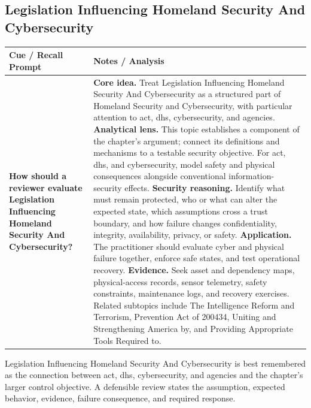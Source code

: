 \documentclass[11pt]{article}
\newcommand{\CornellHeader}{%
\rowcolor{Navy}\color{white}\bfseries Cue / Recall Prompt & \color{white}\bfseries Notes / Analysis\\\hline}
\newcommand{\CornellRow}[2]{%
\cellcolor{CueGray}\RaggedRight\textbf{#1} & \RaggedRight #2\\\hline}
\begin{document}
\subsection*{Legislation Influencing Homeland Security And Cybersecurity}
\begin{longtable}{>{\RaggedRight\arraybackslash}p{}|>{\RaggedRight\arraybackslash}p{}}
\CornellHeader
\CornellRow{How should a reviewer evaluate Legislation Influencing Homeland Security And Cybersecurity?}{\textbf{Core idea.} Treat Legislation Influencing Homeland Security And Cybersecurity as a structured part of Homeland Security and Cybersecurity, with particular attention to act, dhs, cybersecurity, and agencies. \textbf{Analytical lens.} This topic establishes a component of the chapter's argument; connect its definitions and mechanisms to a testable security objective. For act, dhs, and cybersecurity, model safety and physical consequences alongside conventional information-security effects. \textbf{Security reasoning.} Identify what must remain protected, who or what can alter the expected state, which assumptions cross a trust boundary, and how failure changes confidentiality, integrity, availability, privacy, or safety. \textbf{Application.} The practitioner should evaluate cyber and physical failure together, enforce safe states, and test operational recovery. \textbf{Evidence.} Seek asset and dependency maps, physical-access records, sensor telemetry, safety constraints, maintenance logs, and recovery exercises. Related subtopics include The Intelligence Reform and Terrorism, Prevention Act of 200434, Uniting and Strengthening America by, and Providing Appropriate Tools Required to.}
\end{longtable}
\begin{topicsummary}
Legislation Influencing Homeland Security And Cybersecurity is best remembered as the connection between act, dhs, cybersecurity, and agencies and the chapter's larger control objective. A defensible review states the assumption, expected behavior, evidence, failure consequence, and required response.
\end{topicsummary}
\end{document}
